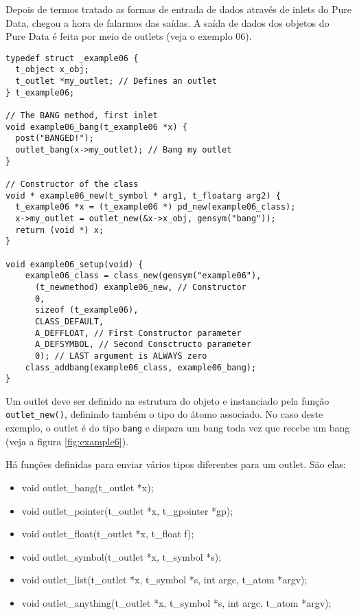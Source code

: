 Depois de termos tratado as formas de entrada de dados através de inlets do
Pure Data, chegou a hora de falarmos das saídas. A saída de dados dos objetos
do Pure Data é feita por meio de outlets (veja o exemplo 06).

\begin{lstlisting}[caption=Exemplo de outlet]
typedef struct _example06 {
  t_object x_obj;
  t_outlet *my_outlet; // Defines an outlet
} t_example06;

// The BANG method, first inlet
void example06_bang(t_example06 *x) {
  post("BANGED!");
  outlet_bang(x->my_outlet); // Bang my outlet
}

// Constructor of the class
void * example06_new(t_symbol * arg1, t_floatarg arg2) {
  t_example06 *x = (t_example06 *) pd_new(example06_class);
  x->my_outlet = outlet_new(&x->x_obj, gensym("bang"));
  return (void *) x;
}

void example06_setup(void) {
    example06_class = class_new(gensym("example06"),
      (t_newmethod) example06_new, // Constructor
      0, 
      sizeof (t_example06),
      CLASS_DEFAULT,
      A_DEFFLOAT, // First Constructor parameter
      A_DEFSYMBOL, // Second Consctructo parameter
      0); // LAST argument is ALWAYS zero
    class_addbang(example06_class, example06_bang);
}
\end{lstlisting}

Um outlet deve ser definido na estrutura do objeto e instanciado pela função
\texttt{outlet\_new()}, definindo também o tipo do átomo associado.
No caso deste exemplo, o outlet é do tipo \texttt{bang} e dispara um bang toda
vez que recebe um bang (veja a figura \ref{fig:example6}).


Há funções definidas para enviar vários tipos diferentes para um outlet.
São elas:

\begin{itemize}
\item void outlet\_bang(t\_outlet *x);
\item void outlet\_pointer(t\_outlet *x, t\_gpointer *gp);
\item void outlet\_float(t\_outlet *x, t\_float f);
\item void outlet\_symbol(t\_outlet *x, t\_symbol *s);
\item void outlet\_list(t\_outlet *x, t\_symbol *s, int argc, t\_atom *argv);
\item void outlet\_anything(t\_outlet *x, t\_symbol *s, int argc, t\_atom *argv);
\end{itemize}

